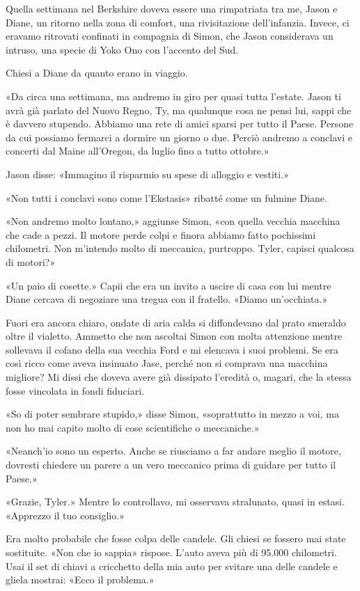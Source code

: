 Quella settimana nel Berkshire doveva essere una rimpatriata tra me,
Jason e Diane, un ritorno nella zona di comfort, una rivisitazione
dell'infanzia. Invece, ci eravamo ritrovati confinati in compagnia di
Simon, che Jason considerava un intruso, una specie di Yoko Ono con
l'accento del Sud.

Chiesi a Diane da quanto erano in viaggio.

«Da circa una settimana, ma andremo in giro per quasi tutta l'estate.
Jason ti avrà già parlato del Nuovo Regno, Ty, ma qualunque cosa ne
pensi lui, sappi che è davvero stupendo. Abbiamo una rete di amici
sparsi per tutto il Paese. Persone da cui possiamo fermarci a dormire un
giorno o due. Perciò andremo a conclavi e concerti dal Maine all'Oregon,
da luglio fino a tutto ottobre.»

Jason disse: «Immagino il risparmio su spese di alloggio e vestiti.»

«Non tutti i conclavi sono come l'Ekstasis» ribatté come un fulmine
Diane.

«Non andremo molto lontano,» aggiunse Simon, «con quella vecchia
macchina che cade a pezzi. Il motore perde colpi e finora abbiamo fatto
pochissimi chilometri. Non m'intendo molto di meccanica, purtroppo.
Tyler, capisci qualcosa di motori?»

«Un paio di cosette.» Capii che era un invito a uscire di casa con lui
mentre Diane cercava di negoziare una tregua con il fratello. «Diamo
un'occhiata.»

Fuori era ancora chiaro, ondate di aria calda si diffondevano dal prato
smeraldo oltre il vialetto. Ammetto che non ascoltai Simon con molta
attenzione mentre sollevava il cofano della sua vecchia Ford e mi
elencava i suoi problemi. Se era così ricco come aveva insinuato Jase,
perché non si comprava una macchina migliore? Mi dissi che doveva avere
già dissipato l'eredità o, magari, che la stessa fosse vincolata in
fondi fiduciari.

«So di poter sembrare stupido,» disse Simon, «soprattutto in mezzo a
voi, ma non ho mai capito molto di cose scientifiche o meccaniche.»

«Neanch'io sono un esperto. Anche se riusciamo a far andare meglio il
motore, dovresti chiedere un parere a un vero meccanico prima di guidare
per tutto il Paese.»

«Grazie, Tyler.» Mentre lo controllavo, mi osservava stralunato, quasi
in estasi. «Apprezzo il tuo consiglio.»

Era molto probabile che fosse colpa delle candele. Gli chiesi se fossero
mai state sostituite. «Non che io sappia» rispose. L'auto aveva più di
95.000 chilometri. Usai il set di chiavi a cricchetto della mia auto per
svitare una delle candele e gliela mostrai: «Ecco il problema.»

